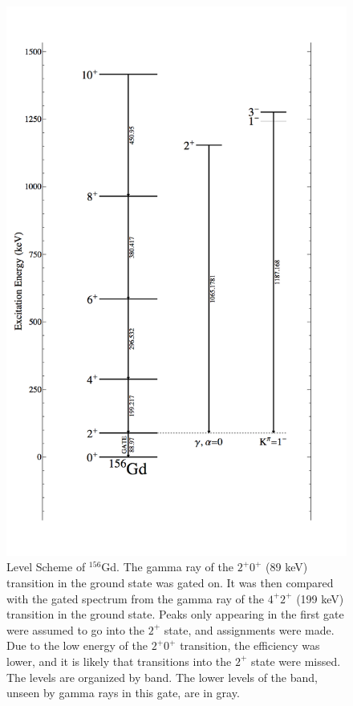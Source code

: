 \begin{figure}
    \centering
    \includegraphics[scale=0.3]{156GdTablesAndFigs/156Gd_2to0.png}
    \caption{Level Scheme of $^{156}$Gd. The gamma ray of the $2^+$\rightarrow$0^+$ (89 keV) transition in the ground state was gated on. It was then compared with the gated spectrum from the gamma ray of the $4^+$\rightarrow$2^+$ (199 keV) transition in the ground state. Peaks only appearing in the first gate were assumed to go into the $2^+$ state, and assignments were made. Due to the low energy of the $2^+$\rightarrow$0^+$ transition, the efficiency was lower, and it is likely that transitions into the $2^+$ state were missed. The levels are organized by band. The lower levels of the band, unseen by gamma rays in this gate, are in gray.}
    \label{fig:156_2to0}
\end{figure}